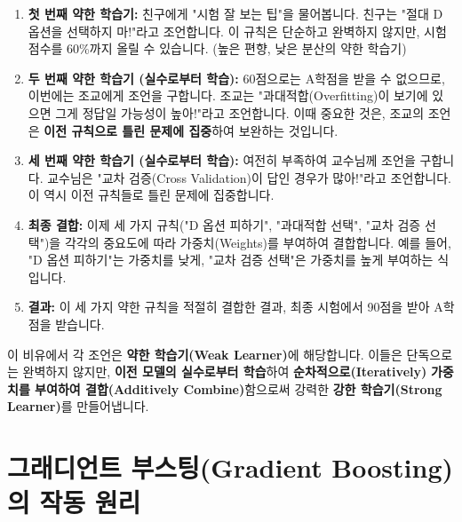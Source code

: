 \documentclass[11pt,a4paper]{article}
\theoremstyle{definition}
\begin{document}
\begin{tcolorbox}[example, title={시험 통과 비유}] %
\begin{enumerate}
    \item \textbf{첫 번째 약한 학습기:} 친구에게 "시험 잘 보는 팁"을 물어봅니다. 친구는 "절대 D 옵션을 선택하지 마!"라고 조언합니다. 이 규칙은 단순하고 완벽하지 않지만, 시험 점수를 60\%까지 올릴 수 있습니다. (높은 편향, 낮은 분산의 약한 학습기)
    \item \textbf{두 번째 약한 학습기 (실수로부터 학습):} 60점으로는 A학점을 받을 수 없으므로, 이번에는 조교에게 조언을 구합니다. 조교는 "과대적합(Overfitting)이 보기에 있으면 그게 정답일 가능성이 높아!"라고 조언합니다. 이때 중요한 것은, 조교의 조언은 \textbf{이전 규칙으로 틀린 문제에 집중}하여 보완하는 것입니다.
    \item \textbf{세 번째 약한 학습기 (실수로부터 학습):} 여전히 부족하여 교수님께 조언을 구합니다. 교수님은 "교차 검증(Cross Validation)이 답인 경우가 많아!"라고 조언합니다. 이 역시 이전 규칙들로 틀린 문제에 집중합니다.
    \item \textbf{최종 결합:} 이제 세 가지 규칙("D 옵션 피하기", "과대적합 선택", "교차 검증 선택")을 각각의 중요도에 따라 가중치(Weights)를 부여하여 결합합니다. 예를 들어, "D 옵션 피하기"는 가중치를 낮게, "교차 검증 선택"은 가중치를 높게 부여하는 식입니다.
    \item \textbf{결과:} 이 세 가지 약한 규칙을 적절히 결합한 결과, 최종 시험에서 90점을 받아 A학점을 받습니다.
\end{enumerate}
\end{tcolorbox}

이 비유에서 각 조언은 \textbf{약한 학습기(Weak Learner)}에 해당합니다. 이들은 단독으로는 완벽하지 않지만, \textbf{이전 모델의 실수로부터 학습}하여 \textbf{순차적으로(Iteratively)} \textbf{가중치를 부여하여 결합(Additively Combine)}함으로써 강력한 \textbf{강한 학습기(Strong Learner)}를 만들어냅니다.

\newpage
\section{그래디언트 부스팅(Gradient Boosting)의 작동 원리}
\end{document}
